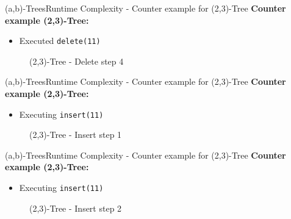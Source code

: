 
\begin{frame}{(a,b)-Trees}{Runtime Complexity - Counter example for (2,3)-Tree}
  \textbf{Counter example (2,3)-Tree:}
  \begin{itemize}
    \item
      Executed \texttt{\color{MainA}delete(11)}
  \end{itemize}
  \begin{figure}
    \begin{adjustbox}{width=0.6\linewidth}
      
    \end{adjustbox}
    \label{fig:a_b_tree:2_3_tree_5}
    \caption{(2,3)-Tree - Delete step 4}
  \end{figure}
\end{frame}


\begin{frame}{(a,b)-Trees}{Runtime Complexity - Counter example for (2,3)-Tree}
  \textbf{Counter example (2,3)-Tree:}
  \begin{itemize}
    \item
      Executing \texttt{\color{MainA}insert(11)}
  \end{itemize}
  \begin{figure}
    \begin{adjustbox}{width=0.7\linewidth}
      
    \end{adjustbox}
    \label{fig:a_b_tree:2_3_tree_6}
    \caption{(2,3)-Tree - Insert step 1}
  \end{figure}
\end{frame}


\begin{frame}{(a,b)-Trees}{Runtime Complexity - Counter example for (2,3)-Tree}
  \textbf{Counter example (2,3)-Tree:}
  \begin{itemize}
    \item
      Executing \texttt{\color{MainA}insert(11)}
  \end{itemize}
  \begin{figure}
    \begin{adjustbox}{width=0.7\linewidth}
      
    \end{adjustbox}
    \label{fig:a_b_tree:2_3_tree_7}
    \caption{(2,3)-Tree - Insert step 2}
  \end{figure}
\end{frame}

